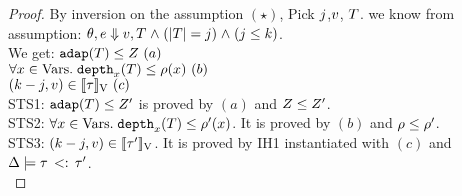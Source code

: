 \begin{proof}
By inversion on the assumption $(\star)$, Pick $j$,$v$,
$T$. we know from assumption: $ \theta, e \mathrel{\Downarrow} v, T \mathrel{\wedge}
(|T| = j) \mathrel{\wedge} (j \leq k) $.\\
We get: $\mathtt{adap}(T) \leq Z ~(a)$\\
$\forall x \in \mbox{Vars}.\;  \mathtt{depth}_{x}(T) \leq \rho(x)~(b)$\\
$ (k - j,  v) \in [\![ \tau ]\!]_{\text{V}}~(c)$\\

STS1: $\mathtt{adap}(T) \leq Z' $ is proved by $(a)$ and $Z \leq
Z'$. \\
STS2: $\forall x \in \mbox{Vars}.\;  \mathtt{depth}_{x}(T) \leq
\rho'(x)$. It is proved by $(b)$ and $\rho \leq \rho'$. \\
STS3: $ (k - j,  v) \in [\![ \tau' ]\!]_{\text{V}}$. It is proved by
IH1 instantiated with $(c)$  and $ \Delta \models \tau \, <: \, \tau'$.\\


\end{proof}
